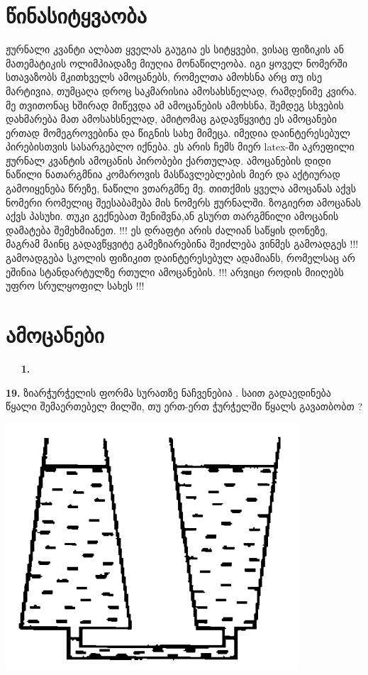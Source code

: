 \documentclass[12pt,a4paper,]{report}
\begin{document}
\tableofcontents

\newpage

\chapter{წინასიტყვაობა}
	ჟურნალი კვანტი ალბათ ყველას გაუგია ეს სიტყვები, ვისაც ფიზიკის ან მათემატიკის ოლიმპიადაზე მიუღია მონაწილეობა. იგი ყოველ ნომერში სთავაზობს მკითხველს ამოცანებს, რომელთა ამოხსნა არც თუ ისე მარტივია, თუმცაღა დროც საკმარისია ამოსახსნელად, რამდენიმე კვირა. მე თვითონაც ხშირად მიწევდა ამ ამოცანების ამოხსნა, შემდეგ სხვების დახმარება მათ ამოსახსნელად, ამიტომაც გადავწყვიტე ეს ამოცანები ერთად მომეგროვებინა და წიგნის სახე მიმეცა. იმედია დაინტერესებულ პირებისთვის სასარგებლო იქნება. ეს არის ჩემს მიერ latex-ში აკრეფილი ჟურნალ კვანტის ამოცანის პირობები ქართულად. ამოცანების დიდი ნაწილი ნათარგმნია კომაროვის მასწავლებლების მიერ და აქტიურად გამოიყენება წრეზე, ნაწილი ვთარგმნე მე. თითქმის ყველა ამოცანას აქვს ნომერი რომელიც შეესაბამება მის ნომერს ჟურნალში. ზოგიერთ ამოცანას აქვს პასუხი. თუკი გექნებათ შენიშვნა,ან გსურთ თარგმნილი ამოცანის დამატება შემეხმიანეთ. !!! ეს დრაფტი არის ძალიან საწყის დონეზე, მაგრამ მაინც გადავწყვიტე გამეზიარებინა შეიძლება ვინმეს გამოადგეს !!! გამოადგება სკოლის ფიზიკით დაინტერესებულ ადამიანს, რომელსაც არ ეშინია სტანდარტულზე რთული ამოცანების. !!! არვიცი როდის მიიღებს უფრო სრულყოფილ სახეს !!!
\chapter{ამოცანები}
$\ \quad$ \textbf{1.} 

\textbf{19.} ზიარჭურჭელის ფორმა სურათზე ნაჩვენებია . საით გადაედინება წყალი შემაერთებელ მილში, თუ ერთ-ერთ ჭურჭელში წყალს გავათბობთ ? 
		\begin{center}
			\includegraphics[scale=0.3]{images/19.png}
		\end{center}
\end{document}
